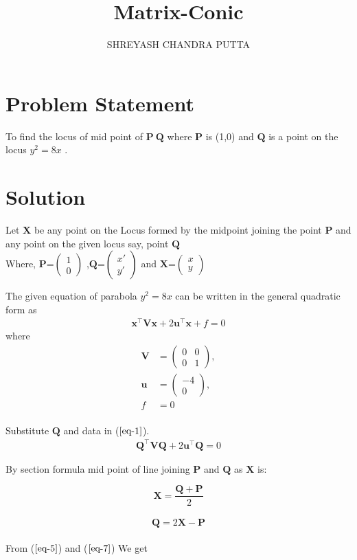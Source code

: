 \documentclass[journal,10pt,twocolumn]{article}
\title{
Matrix-Conic
}
\author{SHREYASH CHANDRA PUTTA}
\newcommand{\myvec}[1]{\ensuremath{\begin{pmatrix}#1\end{pmatrix}}}
\let\vec\mathbf
\let\vec\mathbf
\begin{document}
\maketitle
\tableofcontents
\bigskip
\section{Problem Statement}
To find the locus of mid point of $\vec{P\:Q}$ where $\vec{P}$ is (1,0) and $\vec{Q}$ is a point on the locus $y^{2} = 8x$ .

\section{Solution}
Let $\vec{X}$ be any point on the Locus formed by the midpoint joining the point $\vec{P}$ and any point on the given locus say, point $\vec{Q}$  \\

Where, 
  ${\vec{P}}$=$\myvec{
  1\\
  0}$
  ,${\vec{Q}}$=$\myvec{
  x'\\
  y'}$
 and ${\vec{X}}$=$\myvec{
  x\\
  y}$


The given equation of parabola $y^2 = 8x$ can be written in the general quadratic form as
\begin{align}
    \vec{x}^{\top}\vec{V}\vec{x}+2\vec{u}^{\top}\vec{x}+f=0
    \label{eq-1}
    \end{align}
where
\begin{align}
	\label{eq:V_matrix}
	\vec{V} &= \myvec{0 & 0\\0 & 1},
	\\
	\label{eq:u_vector}
	\vec{u} &= \myvec{-4\\0},
	\\
	\label{eq:f_value}
	f &= 0
\end{align}
\\
Substitute $\vec{Q}$ and data in ($\ref{eq-1}$).
\\
\begin{align}
    \vec{Q}^{\top}\vec{V}\vec{Q}+2\vec{u}^{\top}\vec{Q}=0
    \label{eq-5}
    \end{align}

By section formula
mid point of line joining $\vec{P}$ and $\vec{Q}$ as $\vec{X}$ is:
 
 \begin{equation}
	\vec{X}=\frac{\vec{Q}+\vec{P}}{2}
	 \label{eq-6}
\end{equation}
\\
 \begin{equation}
	\vec{Q}=2\vec{X}-\vec{P}
	 \label{eq-7}
\end{equation}
\\
From ($\ref{eq-5}$) and ($\ref{eq-7}$) We get 
\\
\end{document}
